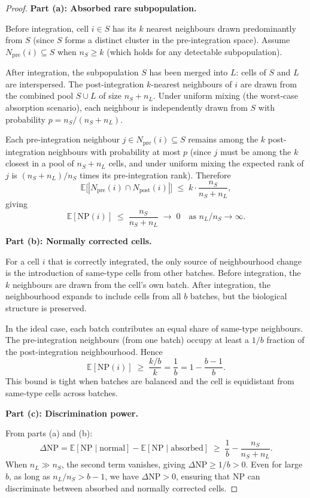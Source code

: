 \documentclass[10pt]{article}
\begin{document}
\begin{proof}
\textbf{Part (a): Absorbed rare subpopulation.}

Before integration, cell $i \in S$ has its $k$ nearest neighbours drawn
predominantly from $S$ (since $S$ forms a distinct cluster in the
pre-integration space).  Assume $N_{\mathrm{pre}}(i) \subseteq S$ when
$n_S \ge k$ (which holds for any detectable subpopulation).

After integration, the subpopulation $S$ has been merged into $L$:
cells of $S$ and $L$ are interspersed.  The post-integration $k$-nearest
neighbours of $i$ are drawn from the combined pool $S \cup L$ of size
$n_S + n_L$.  Under uniform mixing (the worst-case absorption scenario),
each neighbour is independently drawn from $S$ with probability
$p = n_S/(n_S + n_L)$.

Each pre-integration neighbour $j \in N_{\mathrm{pre}}(i) \subseteq S$
remains among the $k$ post-integration neighbours with probability at
most $p$ (since $j$ must be among the $k$ closest in a pool of
$n_S + n_L$ cells, and under uniform mixing the expected rank of $j$ is
$(n_S + n_L)/n_S$ times its pre-integration rank).  Therefore
\[
    \mathbb{E}\bigl[|N_{\mathrm{pre}}(i) \cap N_{\mathrm{post}}(i)|\bigr]
    \;\le\; k \cdot \frac{n_S}{n_S + n_L},
\]
giving
\[
    \mathbb{E}[\mathrm{NP}(i)]
    \;\le\; \frac{n_S}{n_S + n_L}
    \;\to\; 0 \quad\text{as } n_L/n_S \to \infty.
\]

\medskip
\textbf{Part (b): Normally corrected cells.}

For a cell $i$ that is correctly integrated, the only source of
neighbourhood change is the introduction of same-type cells from other
batches.  Before integration, the $k$ neighbours are drawn from the cell's
own batch.  After integration, the neighbourhood expands to include cells
from all $b$ batches, but the biological structure is preserved.

In the ideal case, each batch contributes an equal share of same-type
neighbours.  The pre-integration neighbours (from one batch) occupy at
least a $1/b$ fraction of the post-integration neighbourhood.  Hence
\[
    \mathbb{E}[\mathrm{NP}(i)]
    \;\ge\; \frac{k/b}{k}
    = \frac{1}{b}
    = 1 - \frac{b-1}{b}.
\]
This bound is tight when batches are balanced and the cell is equidistant
from same-type cells across batches.

\medskip
\textbf{Part (c): Discrimination power.}

From parts (a) and (b):
\[
    \Delta\mathrm{NP}
    = \mathbb{E}[\mathrm{NP}\mid\text{normal}]
    - \mathbb{E}[\mathrm{NP}\mid\text{absorbed}]
    \;\ge\; \frac{1}{b} - \frac{n_S}{n_S + n_L}.
\]
When $n_L \gg n_S$, the second term vanishes, giving
$\Delta\mathrm{NP} \ge 1/b > 0$.  Even for large $b$, as long as
$n_L/n_S > b - 1$, we have $\Delta\mathrm{NP} > 0$, ensuring that
NP can discriminate between absorbed and normally corrected cells.


\end{proof}
\end{document}

